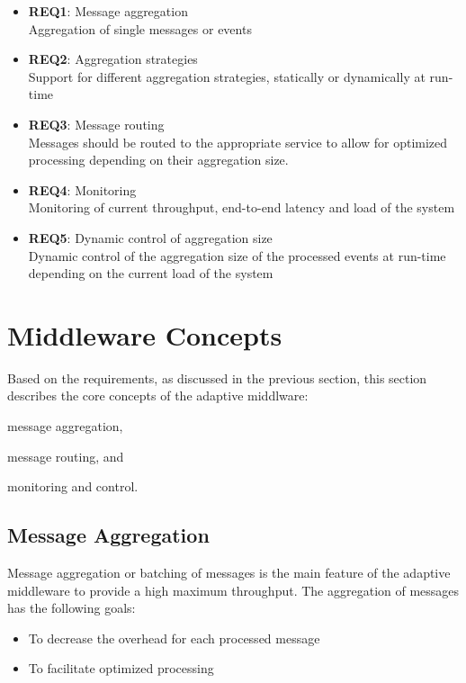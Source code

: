 \begin{itemize}
	\item \textbf{REQ1}: Message aggregation\\
	Aggregation of single messages or events
	\item \textbf{REQ2}: Aggregation strategies\\
	Support for different aggregation strategies, statically or dynamically at run-time
	\item \textbf{REQ3}: Message routing\\
	Messages should be routed to the appropriate service to allow for optimized processing depending on their aggregation size.
	\item \textbf{REQ4}: Monitoring\\
	Monitoring of current throughput, end-to-end latency and load of the system
	\item \textbf{REQ5}: Dynamic control of aggregation size\\
	Dynamic control of the aggregation size of the processed events at run-time depending on the current load of the system
\end{itemize}

\section{Middleware Concepts}
\label{sec:ch05_middleware_concepts}
Based on the requirements, as discussed in the previous section, this section describes the core concepts of the adaptive middlware: 
\begin{inparaenum}[(1)]
	\item message aggregation,
	\item message routing, and
	\item monitoring and control.
\end{inparaenum}

\subsection{Message Aggregation}
\label{sec:ch05_aggregator}
Message aggregation or batching of messages is the main feature of the adaptive middleware to provide a high maximum throughput.
The aggregation of messages has the following goals:

\begin{itemize}
	\item To decrease the overhead for each processed message
	\item To facilitate optimized processing
\end{itemize}

